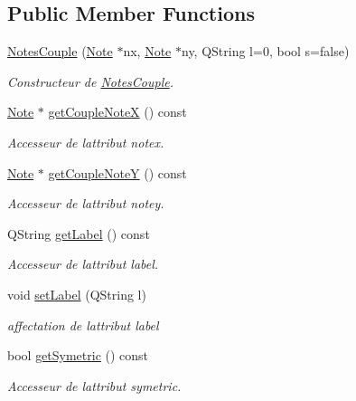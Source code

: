\subsection*{Public Member Functions}
\begin{DoxyCompactItemize}
\item 
\hyperlink{class_notes_couple_ac9bb6dd9ba7376af7030f3b64a24ae88}{Notes\+Couple} (\hyperlink{class_note}{Note} $\ast$nx, \hyperlink{class_note}{Note} $\ast$ny, Q\+String l=0, bool s=false)
\begin{DoxyCompactList}\small\item\em Constructeur de \hyperlink{class_notes_couple}{Notes\+Couple}. \end{DoxyCompactList}\item 
\hyperlink{class_note}{Note} $\ast$ \hyperlink{class_notes_couple_a982a3efc376c58fb82cf508187cfb726}{get\+Couple\+NoteX} () const
\begin{DoxyCompactList}\small\item\em Accesseur de l\textquotesingle{}attribut notex. \end{DoxyCompactList}\item 
\hyperlink{class_note}{Note} $\ast$ \hyperlink{class_notes_couple_a88ed049d759024520c07f1412a6a7d0a}{get\+Couple\+NoteY} () const
\begin{DoxyCompactList}\small\item\em Accesseur de l\textquotesingle{}attribut notey. \end{DoxyCompactList}\item 
Q\+String \hyperlink{class_notes_couple_a7ea47703a7ae6e11c46a2078bfc90924}{get\+Label} () const
\begin{DoxyCompactList}\small\item\em Accesseur de l\textquotesingle{}attribut label. \end{DoxyCompactList}\item 
void \hyperlink{class_notes_couple_a771299450dc621f021e1a9a2cc066a02}{set\+Label} (Q\+String l)
\begin{DoxyCompactList}\small\item\em affectation de l\textquotesingle{}attribut label \end{DoxyCompactList}\item 
bool \hyperlink{class_notes_couple_ad27081ad94a661ab624670062664a6bd}{get\+Symetric} () const
\begin{DoxyCompactList}\small\item\em Accesseur de l\textquotesingle{}attribut symetric. \end{DoxyCompactList}\end{DoxyCompactItemize}


